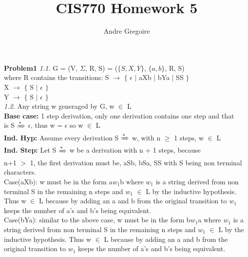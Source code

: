 \documentclass[12pt]{report}
\begin{document}
\newcommand\tab[1][1cm]{\hspace*{#1}}

\author{Andre Gregoire}
\title{CIS770 Homework 5}
\maketitle

\textbf{ Problem1}\newline
\textit{1.1.} \newline 
G = (V, $\Sigma$, R, S) = ($\{S,X,Y\}$, $\{a,b\}$, R, S) \\
where R contains the transitions:
\tab S $\rightarrow$ $\{$ $\epsilon$ $\vert$ aXb $\vert$ bYa $\vert$ SS $\}$ \\
\tab X $\rightarrow$ $\{$ S $\vert$ $\epsilon$ $\}$ \\
\tab Y $\rightarrow$ $\{$ S $\vert$ $\epsilon$ $\}$ \\

\textit{1.2.}\newline
Any string w generaged by G, w $\in$ L\\
\textbf{Base case:} 1 step derivation, only one derivation contains one step and that \\ is S $\xRightarrow{*}$ $\epsilon$, thus w = $\epsilon$ so w $\in$ L \\

\textbf{Ind. Hyp:} Assume every derivation S $\xRightarrow{*}$ w, with n $\geq$ 1 steps, w $\in$ L \\

\textbf{Ind. Step:} Let S $\xRightarrow{*}$ w be a derivation with n + 1 steps, because \\ n+1 $>$ 1, the first derivation must be, aSb, bSa, SS with S being non terminal characters. \\

Case(aXb): w must be in the form a$w_1$b where $w_1$ is a string derived from non terminal S in the remaining n steps and $w_1$ $\in$ L by the inductive hypothesis. Thus w $\in$ L because by adding an a and b from the original transition to $w_1$ keeps the number of a's and b's being equivalent. \\

Case(bYa): similar to the above case, w must be in the form b$w_1$a where $w_1$ is a string derived from non terminal S in the remaining n steps and $w_1$ $\in$ L by the inductive hypothesis. Thus w $\in$ L because by adding an a and b from the original transition to $w_1$ keeps the number of a's and b's being equivalent. \\
\end{document}
